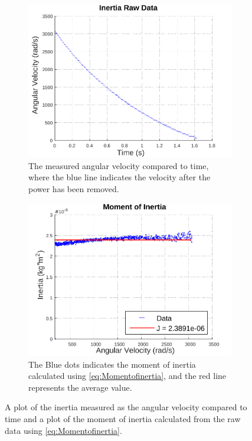 \begin{figure}[H]
  \setcounter{subfigure}{0}
  \centering
  \begin{subfigure}{0.48\textwidth}
    \centering
    \includegraphics[width=1.2\linewidth]{figures/inertiaRawData.pdf}
    \caption{The measured angular velocity compared to time, where the blue line indicates the velocity after the power has been removed.}
    \label{inertiaRawData}
  \end{subfigure}
  \begin{subfigure}{0.48\textwidth}
    \centering
    \includegraphics[width=1.2\linewidth]{figures/momentOfInertia.pdf}
    \caption{The Blue dots indicates the moment of inertia calculated using \eqref{eq:Momentofinertia}, and the red line represents the average value.}
  	\label{momentOfInertia}
  \end{subfigure}
  \caption{A plot of the inertia measured as the angular velocity compared to time and a plot of the moment of inertia calculated from the raw data using \eqref{eq:Momentofinertia}.}
  \label{yo}
\end{figure}
